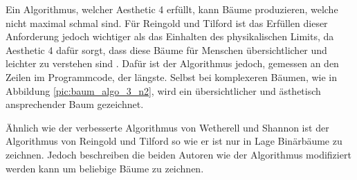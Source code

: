 Ein Algorithmus, welcher Aesthetic 4 erfüllt, kann Bäume produzieren, welche nicht maximal schmal sind. 
Für Reingold und Tilford ist das Erfüllen dieser Anforderung jedoch wichtiger als das Einhalten des physikalischen Limits, 
da Aesthetic 4 dafür sorgt, dass diese Bäume für Menschen übersichtlicher und leichter zu verstehen sind \cite[]{q2}. Dafür ist der Algorithmus 
jedoch, gemessen an den Zeilen im Programmcode, der längste. Selbst bei komplexeren Bäumen, wie in Abbildung \ref{pic:baum_algo_3_n2},
wird ein übersichtlicher und ästhetisch ansprechender Baum gezeichnet. 

Ähnlich wie der verbesserte Algorithmus von Wetherell und Shannon ist der Algorithmus von Reingold und Tilford so wie er ist nur in Lage
Binärbäume zu zeichnen. Jedoch beschreiben die beiden Autoren wie der Algorithmus modifiziert werden kann um beliebige Bäume zu zeichnen.

